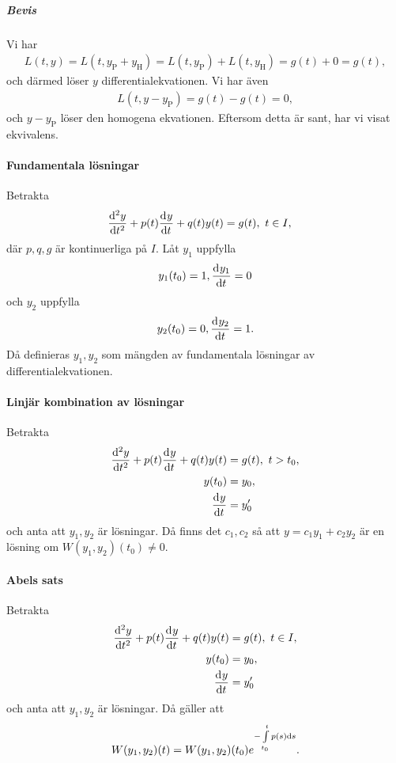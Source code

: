 \subparagraph{Bevis}
Vi har
\begin{align*}
	L(t, y) = L(t, y_{\text{P}} + y_{\text{H}}) = L(t, y_{\text{P}}) + L(t, y_{\text{H}}) = g(t) + 0 = g(t),
\end{align*}
och därmed löser $y$ differentialekvationen. Vi har även
\begin{align*}
	L(t, y - y_{\text{P}}) = g(t) - g(t) = 0,
\end{align*}
och $y - y_{\text{P}}$ löser den homogena ekvationen. Eftersom detta är sant, har vi visat ekvivalens.

\paragraph{Fundamentala lösningar}
Betrakta
\begin{align*}
	\deval[2]{y}{t}{t} + p(t)\deval{y}{t}{t} + q(t)y(t) &= g(t),\ t\in I,
\end{align*}
där $p, q, g$ är kontinuerliga på $I$. Låt $y_{1}$ uppfylla
\begin{align*}
	y_{1}(t_0) = 1, \dv[]{y_{1}}{t} (t_0) = 0
\end{align*}
och $y_{2}$ uppfylla
\begin{align*}
	y_{2}(t_0) = 0, \dv[]{y_{2}}{t} (t_0) = 1.
\end{align*}
Då definieras $y_{1}, y_{2}$ som mängden av fundamentala lösningar av differentialekvationen.

\paragraph{Linjär kombination av lösningar}
Betrakta
\begin{align*}
	\dv[2]{y}{t} (t) + p(t)\dv[]{y}{t} (t) + q(t)y(t) &= g(t),\ t > t_0, \\
	y(t_0)                                              &= y_0, \\
	\dv[]{y}{t} (t_{0})                                 &= y'_{0}
\end{align*}
och anta att $y_{1}, y_{2}$ är lösningar. Då finns det $c_{1}, c_{2}$ så att $y = c_{1}y_{1} + c_{2}y_{2}$ är en lösning om $W(y_{1}, y_{2})(t_{0}) \neq 0$.

\paragraph{Abels sats}
Betrakta
\begin{align*}
	\deval[2]{y}{t}{t} + p(t)\deval{y}{t}{t} + q(t)y(t) &= g(t),\ t\in I, \\
	y(t_0)                                              &= y_0, \\
	\deval{y}{t}{t_{0}}                                 &= y'_{0}
\end{align*}
och anta att $y_{1}, y_{2}$ är lösningar. Då gäller att
\begin{align*}
	W(y_{1}, y_{2})(t) = W(y_{1}, y_{2})(t_{0})e^{-\int\limits_{t_{0}}^{t}p(s)\dd{s}}.
\end{align*}

